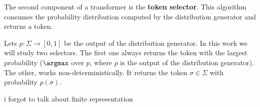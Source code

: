 
The second component of a transformer is the \textbf{token selector}.
This algorithm consumes the probability distribution computed by the distribution generator and returns a token.

Lets $p : \Sigma \to [0,1]$ be the output of the distribution generator.
In this work we will study two selectors.
The first one always returns the token with the largest probability ($\argmax$ over $p$, where $p$ is the output of the distribution generator).
The other, works non-deterministically.
It returns the token $\sigma \in \Sigma$ with probability $p(\sigma)$.

{\color{red} i forgot to talk about finite representation}

